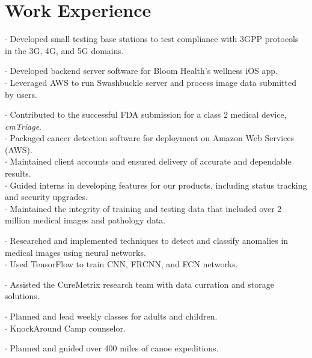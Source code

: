 \section{Work Experience}

$\cdot$ Developed small testing base stations to test compliance with 3GPP protocols in the 3G, 4G, and 5G domains.

$\cdot$ Developed backend server software for Bloom Health's wellness iOS app.\\
$\cdot$ Leveraged AWS to run Swashbuckle server and process image data submitted by users.

$\cdot$ Contributed to the successful FDA submission for a class 2 medical device, {\it cmTriage}.\\
$\cdot$ Packaged cancer detection software for deployment on Amazon Web Services (AWS).\\
$\cdot$ Maintained client accounts and ensured delivery of accurate and dependable results.\\
$\cdot$ Guided interns in developing features for our products, including status tracking and security upgrades.\\
$\cdot$ Maintained the integrity of training and testing data that included over 2 million medical images and pathology data.

$\cdot$ Researched and implemented techniques to detect and classify anomalies in medical images using neural networks.\\
$\cdot$ Used TensorFlow to train CNN, FRCNN, and FCN networks.

$\cdot$ Assisted the CureMetrix research team with data curration and storage solutions.

$\cdot$ Planned and lead weekly classes for adults and children.\\
$\cdot$ KnockAround Camp counselor.

$\cdot$ Planned and guided over 400 miles of canoe expeditions.
